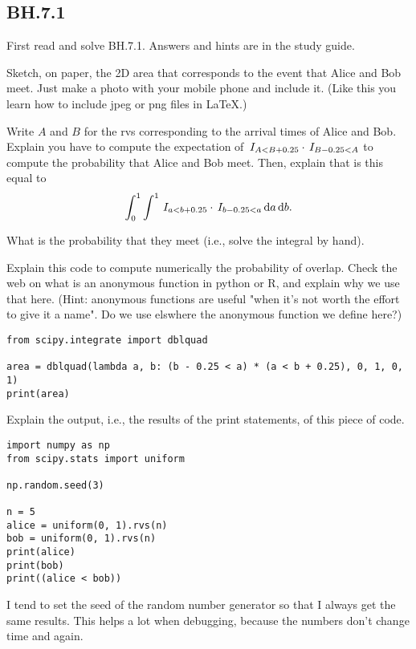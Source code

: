 \subsection{BH.7.1}
\label{sec:bh.7.1}

First read and solve BH.7.1. Answers and hints are in the study guide.


\begin{exercise}\label{ex:ab}
Sketch, on paper, the 2D area that corresponds to the event that Alice and Bob meet. Just make a photo with your mobile phone and include it. (Like this you learn how to include jpeg or png files in \LaTeX.)
\end{exercise}

\begin{exercise}
Write $A$ and $B$ for the rvs corresponding to the arrival times of Alice and Bob.
Explain  you have to compute the expectation of  $\,I_{A<B+0.25}\cdot\,I_{B-0.25 < A}$
to compute the probability that Alice and Bob meet.
Then,  explain that is this equal to
\begin{equation}
\int_0^1\int_{}^1 \,I_{a<b+0.25}\cdot \,I_{b-0.25 < a} \,\textrm{d}a \,\textrm{d}b.
\end{equation}
\end{exercise}

\begin{exercise}
What is the probability that they meet (i.e., solve the integral by hand).
\end{exercise}

\begin{exercise}
Explain this code to compute numerically the probability of overlap. Check the web on what is an anonymous function in python or R, and explain why we use that here.
(Hint: anonymous functions are useful "when it’s not worth the effort to give it a name". Do we use elswhere the anonymous function we define here?)
\begin{verbatim}
from scipy.integrate import dblquad

area = dblquad(lambda a, b: (b - 0.25 < a) * (a < b + 0.25), 0, 1, 0, 1)
print(area)
\end{verbatim}
\end{exercise}

\begin{exercise}
Explain the output, i.e., the results of the print statements, of this piece of code.
\begin{verbatim}
import numpy as np
from scipy.stats import uniform

np.random.seed(3)

n = 5
alice = uniform(0, 1).rvs(n)
bob = uniform(0, 1).rvs(n)
print(alice)
print(bob)
print((alice < bob))
\end{verbatim}
I tend to set the seed of the random number generator so that I always get the same results. This helps a lot when debugging, because the numbers don't change time and again.
\end{exercise}


